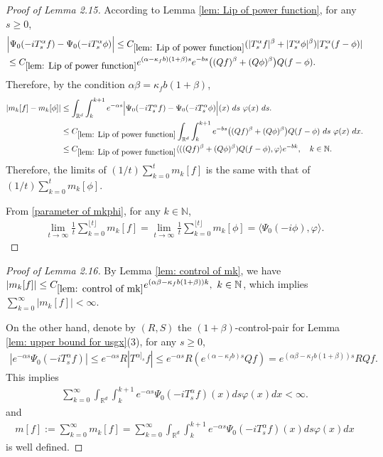 \documentclass[12pt,oneside,english]{amsart}
\theoremstyle{plain}
\theoremstyle{definition}
\numberwithin{equation}{section}
\begin{document}
{\begin{proof}[Proof of Lemma 2.15]
    According to Lemma \ref{lem: Lip of power function}, for any $s\geq 0$,
    \begin{align}
        &\Big|\Psi_0(-iT^{\alpha}_s f)-\Psi_0(-iT^{\alpha}_s\phi)\Big|\leq C_{\ref{lem: Lip of power function}}(|T^{\alpha}_sf|^{\beta}+|T^{\alpha}_s\phi|^{\beta})|T^{\alpha}_s(f-\phi)|
        \\& \leq C_{\ref{lem: Lip of power function}}e^{(\alpha-\kappa_f b)(1+\beta)s}e^{-bs}\big((Qf)^{\beta}+(Q\phi)^{\beta}\big)Q(f-\phi).
    \end{align}
    Therefore, by the condition $\alpha\beta=\kappa_fb(1+\beta)$,
    \begin{align}
        |m_k[f]-m_k[\phi]|&\leq\int_{\mathbb{R}^d}\int_k^{k+1}e^{-\alpha s}\Big|\Psi_0(-iT^{\alpha}_s f)-\Psi_0(-iT^{\alpha}_s\phi)\Big|(x)~ds~\varphi(x)~ds.
        \\&\leq C_{\ref{lem: Lip of power function}}\int_{\mathbb{R}^d}\int_{k}^{k+1} e^{-bs}\big((Qf)^{\beta}+(Q\phi)^{\beta}\big)Q(f-\phi)~ds~ \varphi(x)~dx.
        \\&\leq C_{\ref{lem: Lip of power function}}\langle((Qf)^{\beta}+(Q\phi)^{\beta})Q(f-\phi), \varphi\rangle e^{-bk},\quad k \in \mathbb{N}.
    \end{align}
    Therefore, the limits of $(1/t)\sum_{k=0}^tm_k[f]$ is the same with that of $(1/t)\sum_{k=0}^tm_k[\phi]$.
    
   From \eqref{parameter of mkphi}, for any $k\in \mathbb{N}$,
    \begin{align}
        \lim_{t\rightarrow \infty}\frac{1}{t}\sum_{k=0}^{\lfloor t\rfloor}m_k[f]=\lim_{t\rightarrow \infty}\frac{1}{t}\sum_{k=0}^{\lfloor t \rfloor}m_k[\phi]=\langle\Psi_0(-i\phi),\varphi\rangle.
    \end{align}
\end{proof}

\begin{proof}[Proof of Lemma 2.16]

    By Lemma \ref{lem: control of mk}, we have $|m_k[f]|\leq C_{\ref{lem: control of mk}} e^{(\alpha\beta-\kappa_fb(1+\beta))k},~k\in\mathbb{N}$, which implies $\sum_{k=0}^{\infty}|m_k[f]|<\infty$.

    On the other hand, denote by $(R,S)$ the $(1+\beta)$-control-pair for Lemma \ref{lem: upper bound for usgx}(3), for any $s\geq 0$,
    \begin{align}
        |e^{-\alpha s}\Psi_0(-iT_{s}^{\alpha}f)|\leq e^{-\alpha s}R|T^{\alpha]_s}f|\leq e^{-\alpha s}R(e^{(\alpha-\kappa_fb)s}Qf)=e^{(\alpha\beta-\kappa_fb(1+\beta))s}RQf.
    \end{align}
    This implies
    \begin{align}
        \sum_{k=0}^{\infty}\int_{\mathbb{R}^d}\int_k^{k+1} e^{-\alpha s}\Psi_0(-iT_{s}^{\alpha}f)(x)ds\varphi(x)dx< \infty.
    \end{align}
    and
    \begin{align}
            m[f]:=\sum_{k=0}^{\infty}m_k[f]=\sum_{k=0}^{\infty}\int_{\mathbb{R}^d}\int_k^{k+1} e^{-\alpha s}\Psi_0(-iT_{s}^{\alpha}f)(x)ds\varphi(x)dx
    \end{align}
    is well defined.
\end{proof}
}
\end{document}
